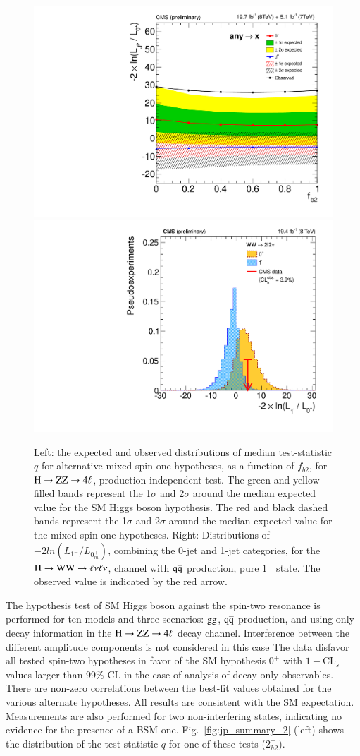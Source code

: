 \begin{figure}[!htbp]
  \begin{center}
\centerline{
\includegraphics[width=0.50\linewidth]{figures/hzz_spin1_summary_PI.pdf}
\includegraphics[width=0.50\linewidth]{figures/hzww_spin1_q1minus.pdf}
}
\caption{Left: the expected and observed distributions of median
  test-statistic $q$ for alternative mixed spin-one hypotheses, as
  a function of $f_{b2}$, for $\mathrm{H}\to\mathrm{Z}\mathrm{Z}\to4\ell$, production-independent
  test.  The green and yellow filled bands represent the 1$\sigma$
  and 2$\sigma$ around the median expected value for the SM Higgs
  boson hypothesis. The red and black dashed bands represent the
  1$\sigma$ and 2$\sigma$ around the median expected value for the
  mixed spin-one hypotheses.  Right: Distributions of $-2
  ln(L_{1^-} /L_{0^{+}_{m}})$, combining the 0-jet and 1-jet
  categories, for the $\mathrm{H}\to\mathrm{W}\mathrm{W}\to\ell\nu\ell\nu$, channel with $\mathrm{\mathrm{q}\mathrm{\overline{q}}}$
  production, pure $1^-$ state. The observed value is indicated by
  the red arrow.
  \label{fig:jp_summary_1}} 
  \end{center}
\end{figure}

The hypothesis test of SM Higgs boson against the spin-two resonance
is performed for ten models and three scenarios: $\mathrm{g}\mathrm{g}$, $\mathrm{\mathrm{q}\mathrm{\overline{q}}}$
production, and using only decay information in the $\mathrm{H}\to\mathrm{Z}\mathrm{Z}\to4\ell$ decay
channel. Interference between the different amplitude components is
not considered in this case The data disfavor all tested spin-two
hypotheses in favor of the SM hypothesis $0^+$ with $1-$CL$_s$ values
larger than 99\% CL in the case of analysis of decay-only observables.
There are non-zero correlations between the best-fit values obtained
for the various alternate hypotheses.  All results are consistent with
the SM expectation. Measurements are also performed for two
non-interfering states, indicating no evidence for the presence of a BSM
one. Fig.~\ref{fig:jp_summary_2} (left) shows the distribution of the test 
statistic $q$ for one of these tests ($2_{h2}^+$).

